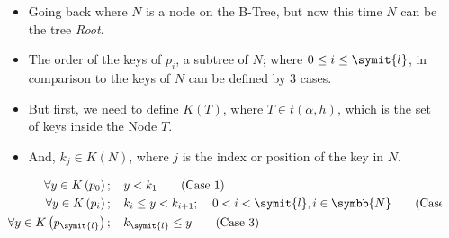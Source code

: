 \begin{frame}
\begin{columns}
\begin{column}{\textlecolumn}
            \begin{block}{}
                \begin{itemize}
                    \item Going back where \(N\) is a node on the B-Tree, but now this time \(N\) can be the tree \emph{Root}.
                    \item The order of the keys of \(p_i\), a subtree of \(N\); where \(0 \leq i \leq \symit{l}\), in comparison to the keys of \(N\) can be defined by 3 cases.
                    \item But first, we need to define \(K\left(T\right)\), where \(T \in t\left(\alpha, h\right)\), which is the set of keys inside the Node \(T\).
                    \item And, \(k_j \in K\left(N\right)\), where \(j\) is the index or position of the key in \(N\).
                \end{itemize}
                \vspace{0.5cm}
                \begin{align}
                    \forall y \in K\left(p_0\right);\mspace{20mu}& y < k_1 \tag{Case 1}\label{case1-subt-t-comp} \\
                    \forall y \in K\left(p_{i}\right);\mspace{20mu}& k_i \leq y < k_{i + 1};\mspace{20mu} 0 < i < \symit{l}, i \in \symbb{N} \tag{Case 2}\label{case2-subt-t-comp} \\
                    \forall y \in K\left(p_{\symit{l}}\right);\mspace{20mu}& k_{\symit{l}} \leq y \tag{Case 3}\label{case3-subt-t-comp}
                \end{align}
            \end{block}
        \end{column}
        \begin{column}{\textricolumn}
            \begin{block}{}
            \end{block}
        \end{column}
    \end{columns}
    \framebreak{}
    \begin{columns}
        \begin{column}{0.5\textwidth}
            \begin{figure}
                \centering{}
                \includegraphics[%

\end{figure}
\end{column}
\end{columns}
\end{frame}

